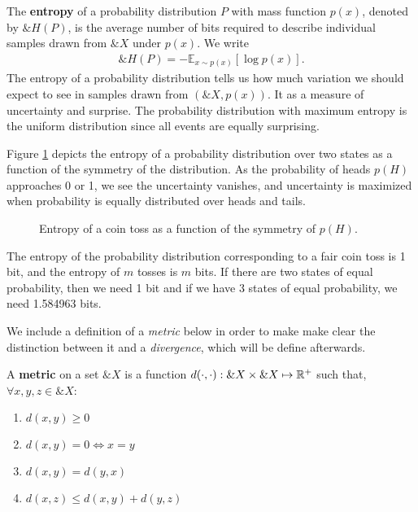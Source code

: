 \begin{definition}
  The \textbf{entropy} of a probability distribution $P$ with mass function
  $p(x)$, denoted by $\&H(P)$, is the average number of bits required to
  describe individual samples drawn from $\&X$ under $p(x)$. We write
  \begin{align}
    \label{eq:entropy}
    \&H(P) = - \mathbb{E}_{x \sim p(x)} \left[ \log{p(x)} \right].
  \end{align}
  The entropy of a probability distribution tells us how much variation we
  should expect to see in samples drawn from $(\&X, p(x))$. It as a measure of
  uncertainty and surprise. The probability distribution with maximum entropy is
  the uniform distribution since all events are equally surprising.
\end{definition}

Figure \ref{fig:entropy-coin-toss} depicts the entropy of a probability
distribution over two states as a function of the symmetry of the distribution.
As the probability of heads $p(H)$ approaches 0 or 1, we see the uncertainty
vanishes, and uncertainty is maximized when probability is equally distributed over heads and tails.

\begin{figure}[H]
  \centering
  \caption{Entropy of a coin toss as a function of the symmetry of $p(H)$.}
  \label{fig:entropy-coin-toss}
\end{figure}

\begin{example}
  The entropy of the probability distribution corresponding to a fair coin toss
  is 1 bit, and the entropy of $m$ tosses is $m$ bits. If there are two states
  of equal probability, then we need 1 bit and if we have 3 states of equal
  probability, we need 1.584963 bits.
\end{example}

We include a definition of a \textit{metric} below in order to make make clear
the distinction between it and a \textit{divergence}, which will be define
afterwards.

\begin{definition}
  A \textbf{metric} on a set $\&X$ is a function $d(\cdot, \cdot): \&X \times
  \&X \mapsto \mathbb{R}^+$ such that, $\forall x, y, z \in \&X$:
  \begin{enumerate}
  \item $d(x, y) \geq 0$
  \item $d(x, y) = 0 \iff x = y$
  \item $d(x, y) = d(y, x)$
  \item $d(x, z) \leq d(x, y) + d(y, z)$
  \end{enumerate}
\end{definition}

